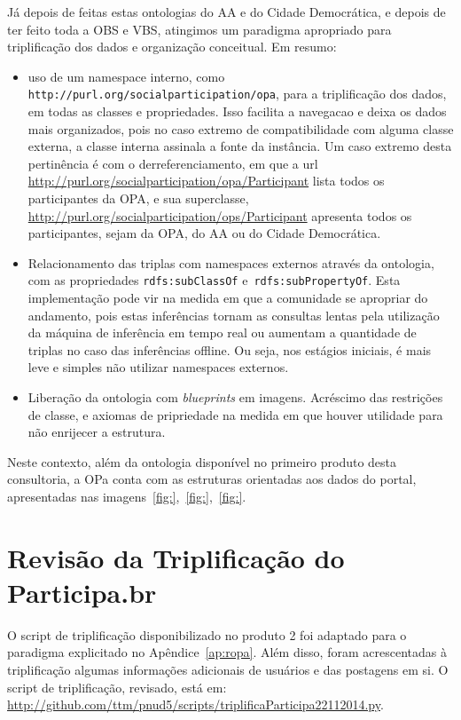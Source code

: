 \documentclass[12pt]{article}
\begin{document}
Já depois de feitas estas ontologias do AA e do Cidade Democrática, e depois de ter feito toda a OBS e VBS, atingimos um paradigma apropriado para triplificação dos dados e organização conceitual. Em resumo:
\begin{itemize}
    \item uso de um namespace interno, como \texttt{http://purl.org/socialparticipation/opa}, para a triplificação dos dados, em todas as classes e propriedades. Isso facilita a navegacao e deixa os dados mais organizados, pois no caso extremo de compatibilidade com alguma classe externa, a classe interna assinala a fonte da instância. Um caso extremo desta pertinência é com o derreferenciamento, em que a url \url{http://purl.org/socialparticipation/opa/Participant} lista todos os participantes da OPA, e sua superclasse, \url{http://purl.org/socialparticipation/ops/Participant} apresenta todos os participantes, sejam da OPA, do AA ou do Cidade Democrática.
    \item Relacionamento das triplas com namespaces externos através da ontologia, com as propriedades \texttt{rdfs:subClassOf} e~\texttt{rdfs:subPropertyOf}. Esta implementação pode vir na medida em que a comunidade se apropriar do andamento, pois estas inferências tornam as consultas lentas pela utilização da máquina de inferência em tempo real ou aumentam a quantidade de triplas no caso das inferências offline. Ou seja, nos estágios iniciais, é mais leve e simples não utilizar namespaces externos.
    \item Liberação da ontologia com \emph{blueprints} em imagens. Acréscimo das restrições de classe, e axiomas de pripriedade na medida em que houver utilidade para não enrijecer a estrutura.
\end{itemize}

Neste contexto, além da ontologia disponível no primeiro produto desta consultoria, a OPa conta com as estruturas orientadas aos dados do portal, apresentadas nas imagens~\ref{fig:},~\ref{fig:},~\ref{fig:}.

\section{Revisão da Triplificação do Participa.br}
O script de triplificação disponibilizado no produto 2 foi adaptado para o paradigma explicitado no Apêndice~\ref{ap:ropa}. Além disso,
foram acrescentadas à triplificação algumas informações adicionais de usuários e das postagens em si. O script de triplificação, revisado, está em: \url{http://github.com/ttm/pnud5/scripts/triplificaParticipa22112014.py}.
\newpage
\end{document}
